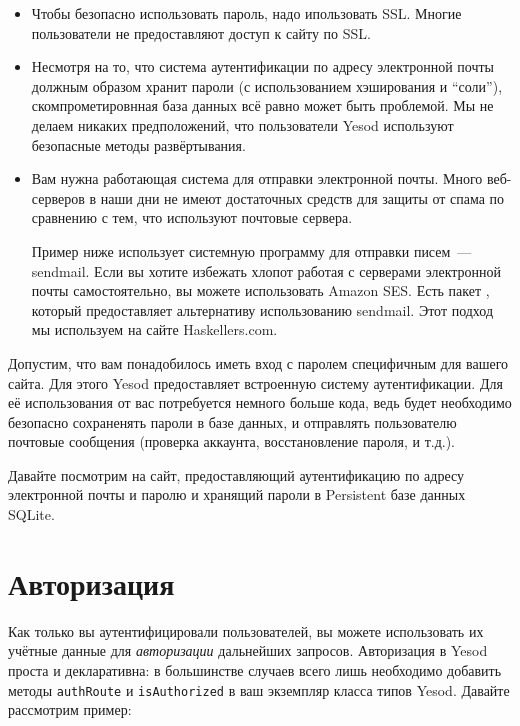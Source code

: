 \begin{itemize}
    \item Чтобы безопасно использовать пароль, надо ипользовать SSL. Многие пользователи не предоставляют доступ к сайту по SSL.

    \item Несмотря на то, что система аутентификации по адресу электронной почты должным образом хранит пароли (с использованием хэширования и ``соли''), скомпрометировнная база данных всё равно может быть проблемой. Мы не делаем никаких предположений, что пользователи Yesod используют безопасные методы развёртывания.

    \item Вам нужна работающая система для отправки электронной почты. Много веб-серверов в наши дни не имеют достаточных средств для защиты от спама по сравнению с тем, что используют почтовые сервера.

    \begin{remark}
    Пример ниже использует системную программу для отправки писем~--- sendmail. Если вы хотите избежать хлопот работая с серверами электронной почты самостоятельно, вы можете использовать Amazon SES. Есть пакет , который предоставляет альтернативу использованию sendmail. Этот подход мы используем на сайте Haskellers.com.
    \end{remark}
\end{itemize}

Допустим, что вам понадобилось иметь вход с паролем специфичным для вашего сайта. Для этого Yesod предоставляет встроенную систему аутентификации. Для её использования от вас потребуется немного больше кода, ведь будет необходимо безопасно сохраненять пароли в базе данных, и отправлять пользователю почтовые сообщения (проверка аккаунта, восстановление пароля, и т.д.).

Давайте посмотрим на сайт, предоставляющий аутентификацию по адресу электронной почты и паролю и хранящий пароли в Persistent базе данных SQLite.


\section{Авторизация}
Как только вы аутентифицировали пользователей, вы можете использовать их учётные данные для \emph{авторизации} дальнейших запросов. Авторизация в Yesod проста и декларативна: в большинстве случаев всего лишь необходимо добавить методы \lstinline'authRoute' и \lstinline'isAuthorized' в ваш экземпляр класса типов Yesod. Давайте рассмотрим пример:

